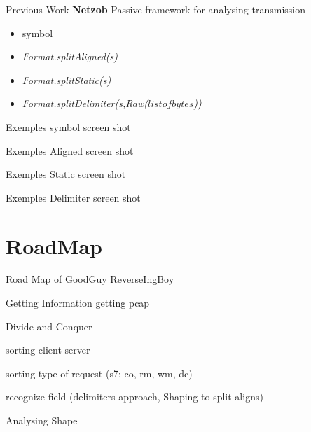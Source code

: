 \documentclass{beamer}
\newcounter{m} %
\newcounter{c} %
\begin{document}
\begin{frame}{Previous Work \textbf{Netzob}}
Passive framework for analysing transmission
\begin{itemize}
\item symbol
\item \textit{Format.splitAligned(s)}
\item \textit{Format.splitStatic(s)}
\item \textit{Format.splitDelimiter(s,Raw($listofbytes$))}
\end{itemize}


\end{frame}

\begin{frame}{Exemples}
symbol screen shot
\end{frame}

\begin{frame}{Exemples}
Aligned screen shot
\end{frame}

\begin{frame}{Exemples}
Static screen shot
\end{frame}

\begin{frame}{Exemples}
Delimiter screen shot
\end{frame}

\section{RoadMap}
\begin{frame}

	\tableofcontents[currentsection]
\end{frame}

\begin{frame}{Road Map of GoodGuy ReverseIngBoy}

\end{frame}
\begin{frame}{Getting Information}
getting pcap
\end{frame}

\begin{frame}{Divide and Conquer}


sorting client server

sorting type of request (s7: co, rm, wm, dc)

recognize field (delimiters approach, Shaping to split aligns)
\end{frame}

\begin{frame}{Analysing Shape}

\end{frame}
\end{document}
